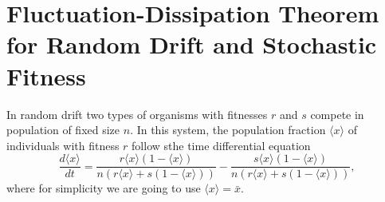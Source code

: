 \section{Fluctuation-Dissipation Theorem for Random Drift and Stochastic Fitness}
In random drift two types of organisms with fitnesses $r$ and $s$ compete in population of fixed size $n$. In this system, the population fraction $\langle x\rangle$ of individuals with fitness $r$  follow sthe time differential equation
\begin{equation}
\frac{d \langle x\rangle}{dt}=\frac{r\langle x\rangle(1-\langle x\rangle)}{n(r\langle x\rangle + s(1-\langle x\rangle))}-\frac{s\langle x\rangle(1-\langle x\rangle)}{n(r\langle x\rangle + s(1-\langle x\rangle))},
\end{equation} 
where for simplicity we are going to use $\langle x\rangle=\bar{x}$.

